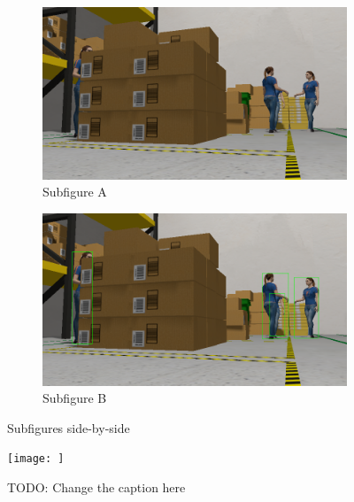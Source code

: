 \begin{figure}
    \centering
    \begin{subfigure}[htp]{0.45\linewidth}
        \centering
        \includegraphics[width=\linewidth]{figures/sim/rgb_img.png}  %
        \caption{Subfigure A}  %
        \label{template:fig:subfigure_a}  %
    \end{subfigure}
    \begin{subfigure}[htp]{0.45\linewidth}
        \centering
        \includegraphics[width=\linewidth]{figures/sim/bbgt.png}  %
        \caption{Subfigure B}  %
        \label{template:fig:subfigure_b}  %
    \end{subfigure}
    \caption{Subfigures side-by-side}  %
    \label{template:fig:subfigures}  %
\end{figure}

\begin{figure}
    \centering
    \texttt{[image: ]}  %
    \caption{TODO: Change the caption here}  %
    \label{fig:example_figure}  %
\end{figure}